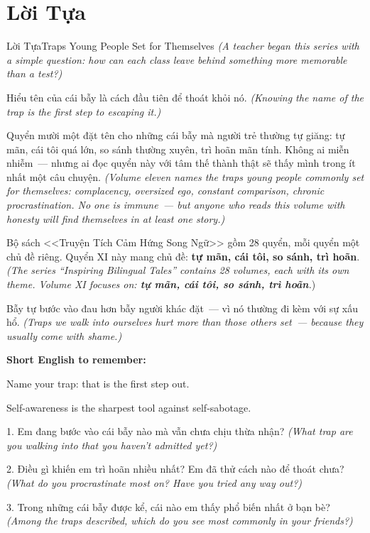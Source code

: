 \chapter*{Lời Tựa}

\begin{truyen}{Lời Tựa}{Traps Young People Set for Themselves}
\textit{(A teacher began this series with a simple question: how can each class leave behind something more memorable than a test?)}

Hiểu tên của cái bẫy là cách đầu tiên để thoát khỏi nó.
\textit{(Knowing the name of the trap is the first step to escaping it.)}

Quyển mười một đặt tên cho những cái bẫy mà người trẻ thường tự giăng: tự mãn, cái tôi quá lớn, so sánh thường xuyên, trì hoãn mãn tính. Không ai miễn nhiễm~--- nhưng ai đọc quyển này với tâm thế thành thật sẽ thấy mình trong ít nhất một câu chuyện.
\textit{(Volume eleven names the traps young people commonly set for themselves: complacency, oversized ego, constant comparison, chronic procrastination. No one is immune~--- but anyone who reads this volume with honesty will find themselves in at least one story.)}

Bộ sách <<Truyện Tích Cảm Hứng Song Ngữ>> gồm 28 quyển, mỗi quyển một chủ đề riêng. Quyển XI này mang chủ đề: \textbf{tự mãn, cái tôi, so sánh, trì hoãn}.
\textit{(The series ``Inspiring Bilingual Tales'' contains 28 volumes, each with its own theme. Volume XI focuses on: \textbf{tự mãn, cái tôi, so sánh, trì hoãn}.})
\end{truyen}

\begin{baihoc}
Bẫy tự bước vào đau hơn bẫy người khác đặt~--- vì nó thường đi kèm với sự xấu hổ.
\textit{(Traps we walk into ourselves hurt more than those others set~--- because they usually come with shame.)}
\end{baihoc}

\begin{ghinhoanh}
\textbf{Short English to remember:}

Name your trap: that is the first step out.

Self-awareness is the sharpest tool against self-sabotage.
\end{ghinhoanh}

\begin{tuhocnhanh}
1. Em đang bước vào cái bẫy nào mà vẫn chưa chịu thừa nhận? \textit{(What trap are you walking into that you haven't admitted yet?)}

2. Điều gì khiến em trì hoãn nhiều nhất? Em đã thử cách nào để thoát chưa? \textit{(What do you procrastinate most on? Have you tried any way out?)}

3. Trong những cái bẫy được kể, cái nào em thấy phổ biến nhất ở bạn bè? \textit{(Among the traps described, which do you see most commonly in your friends?)}
\end{tuhocnhanh}

